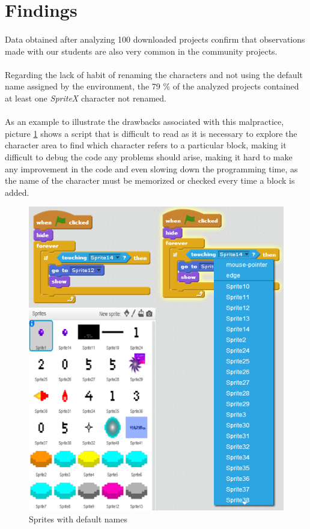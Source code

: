 \documentclass[a4paper,10pt]{article}
\begin{document}
\section{Findings}
\paragraph{}Data obtained after analyzing 100 downloaded projects confirm that observations made with our students are also very common in the community projects.
\paragraph{}Regarding the lack of habit of renaming the characters and not using the default name assigned by the environment, the 79 \% of the analyzed projects contained at least one \textit{SpriteX} character not renamed.
\paragraph{}As an example to illustrate the drawbacks associated with this malpractice, picture \ref{fig:SpriteNaming} shows a script that is difficult to read as it is necessary to explore the character area to find which character refers to a particular block, making it difficult to debug the code any problems should arise, making it hard to make any improvement in the code and even slowing down the programming time, as the name of the character must be memorized or checked every time a block is added. 
\begin{figure}
  \centering
    \includegraphics{img/SpriteNaming.png}
  \caption{Sprites with default names}
  \label{fig:SpriteNaming}
\end{figure}
\end{document}
